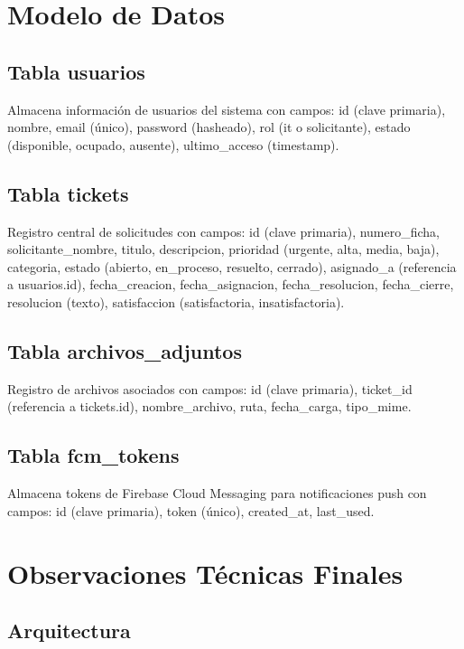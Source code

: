 \documentclass[12pt,a4paper]{article}
\begin{document}
\newpage

\section{Modelo de Datos}

\subsection{Tabla usuarios}

Almacena información de usuarios del sistema con campos: id (clave primaria), nombre, email (único), password (hasheado), rol (it o solicitante), estado (disponible, ocupado, ausente), ultimo\_acceso (timestamp).

\subsection{Tabla tickets}

Registro central de solicitudes con campos: id (clave primaria), numero\_ficha, solicitante\_nombre, titulo, descripcion, prioridad (urgente, alta, media, baja), categoria, estado (abierto, en\_proceso, resuelto, cerrado), asignado\_a (referencia a usuarios.id), fecha\_creacion, fecha\_asignacion, fecha\_resolucion, fecha\_cierre, resolucion (texto), satisfaccion (satisfactoria, insatisfactoria).

\subsection{Tabla archivos\_adjuntos}

Registro de archivos asociados con campos: id (clave primaria), ticket\_id (referencia a tickets.id), nombre\_archivo, ruta, fecha\_carga, tipo\_mime.

\subsection{Tabla fcm\_tokens}

Almacena tokens de Firebase Cloud Messaging para notificaciones push con campos: id (clave primaria), token (único), created\_at, last\_used.

\newpage

\section{Observaciones Técnicas Finales}

\subsection{Arquitectura}
\end{document}
